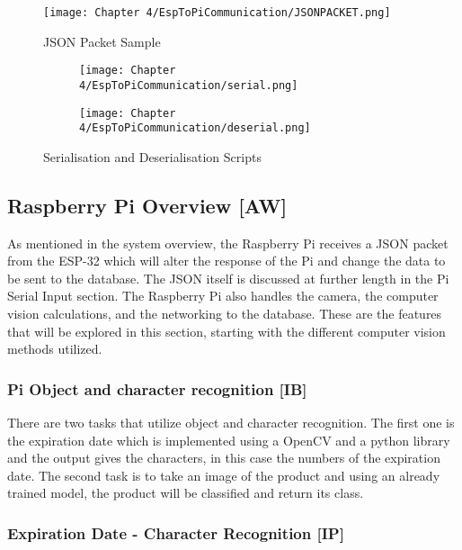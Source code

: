 \begin{figure}[H]        
    \centering
    \texttt{[image: Chapter 4/EspToPiCommunication/JSONPACKET.png]}
    \caption{JSON Packet Sample}
\end{figure} 

\begin{figure}[H]
    \begin{subfigure}{.5\textwidth}
      \centering
      \texttt{[image: Chapter 4/EspToPiCommunication/serial.png]}
    \end{subfigure}%
    \begin{subfigure}{.5\textwidth}
      \centering
      \texttt{[image: Chapter 4/EspToPiCommunication/deserial.png]}
    \end{subfigure}
    \caption{Serialisation and Deserialisation Scripts}
\end{figure}

\subsection{Raspberry Pi Overview [AW]}

As mentioned in the system overview, the Raspberry Pi receives a JSON packet from the ESP-32 which will alter the response of the Pi and change the data to be sent to the database.
The JSON itself is discussed at further length in the Pi Serial Input section.
The Raspberry Pi also handles the camera, the computer vision calculations, and the networking to the database.
These are the features that will be explored in this section, starting with the different computer vision methods utilized.

\subsubsection{Pi Object and character recognition [IB]}

There are two tasks that utilize object and character recognition.
The first one is the expiration date which is implemented using a OpenCV and a python library and the output gives the characters, in this case the numbers of the expiration date.
The second task is to take an image of the product and using an already trained model, the product will be classified and return its class.
	

\subsubsection{Expiration Date - Character Recognition [IP]}

